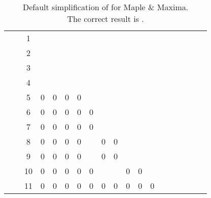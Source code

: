 \documentclass[12pt,english]{article}
\providecommand{\tabularnewline}{\\}
\theoremstyle{definition}
\theoremstyle{remark}
\theoremstyle{plain}
\theoremstyle{plain}
\begin{document}
\begin{table}[H]
\caption{Default simplification of 
for Maple \& Maxima.\protect \\
\mbox{\hspace{4em}}The correct result is .}
\label{Differences}

\begin{tabular}{|c|c|c|cccc|cccccccccccc}
\cline{1-3} 
\multirow{4}{*}{\begin{sideways}

\end{sideways}} & \rule[-9pt]{0pt}{26pt} & 1 & \textbf{} &  &  & \multicolumn{1}{c}{} &  &  &  &  &  &  &  &  &  &  &  & \tabularnewline
\cline{2-3} 
 & \rule[-9pt]{0pt}{26pt}\negthinspace{}\negthinspace{}\negthinspace{}\negthinspace{}\negthinspace{}\negthinspace{} & 2 & \textbf{} & \textbf{} &  & \multicolumn{1}{c}{} &  &  &  &  &  &  &  &  &  &  &  & \tabularnewline
\cline{2-3} 
 & \rule[-9pt]{0pt}{26pt} & 3 & \textbf{} & \textbf{} & \textbf{} & \multicolumn{1}{c}{} &  &  &  &  &  &  &  &  &  &  &  & \tabularnewline
\cline{2-3} 
 & \rule[-9pt]{0pt}{26pt} & 4 & \textbf{} & \textbf{} & \textbf{} & \multicolumn{1}{c}{\textbf{}} &  &  &  &  &  &  &  &  &  &  &  & \tabularnewline
\cline{1-7} 
\multirow{6}{*}{\begin{sideways}
\textsl{\scriptsize }
\end{sideways}} & \rule[-9pt]{0pt}{26pt} & 5 & 0 & 0 & 0 & 0 & \textbf{} &  &  &  &  &  &  &  &  &  &  & \tabularnewline
\cline{2-3} 
 & \rule[-9pt]{0pt}{26pt} & 6 & 0 & 0 & 0 & 0 & 0 & \textbf{} &  &  &  &  &  &  &  &  &  & \tabularnewline
\cline{2-3} 
 & \rule[-9pt]{0pt}{26pt} & 7 & 0 & 0 & 0 & 0 & 0 & \textbf{} & \textbf{} &  &  &  &  &  &  &  &  & \tabularnewline
\cline{2-3} 
 & \rule[-9pt]{0pt}{26pt} & 8 & 0 & 0 & 0 & 0 & \textbf{} & 0 & 0 & \textbf{} &  &  &  &  &  &  &  & \tabularnewline
\cline{2-3} 
 & \rule[-9pt]{0pt}{26pt} & 9 & 0 & 0 & 0 & 0 & \textbf{} & 0 & 0 & \textbf{} & \textbf{} &  &  &  &  &  &  & \tabularnewline
\cline{2-3} 
 & \rule[-11pt]{0pt}{33pt} & 10 & 0 & 0 & 0 & 0 & 0 & \textbf{} & \textbf{} & 0 & 0 & \textbf{} &  &  &  &  &  & \tabularnewline
\cline{1-13} 
\multirow{2}{*}{\begin{sideways}
\textsl{\scriptsize \negthinspace{}\negthinspace{}\negthinspace{}\negthinspace{}\negthinspace{}\negthinspace{}\negthinspace{}\negthinspace{}}
\end{sideways}} & \rule[-9pt]{0pt}{26pt} & 11 & 0 & 0 & 0 & 0 & 0 & 0 & 0 & 0 & 0 & \multicolumn{1}{c|}{0} & \textbf{} &  &  &  &  & \tabularnewline
\cline{2-3} 

\end{tabular}
\end{table}
\end{document}
